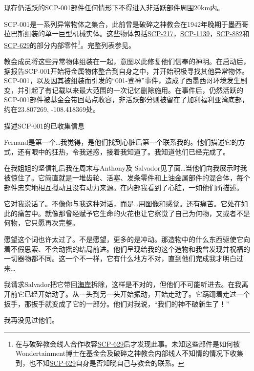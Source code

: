 现存仍活跃的SCP-001部件任何情形下不得进入非活跃部件周围20km内。

SCP-001是一系列异常物体之集合，此前曾是破碎之神教会在1942年晚期于墨西哥拉巴斯组装的单一巨型机械实体。这些物体包括\hyperref[chap:SCP-217]{SCP-217}，\hyperref[chap:SCP-1139]{SCP-1139}，\hyperref[chap:SCP-882]{SCP-882}和\hyperref[chap:SCP-629]{SCP-629}的部分内部零件\footnote{在与破碎教会线人合作收容\hyperref[chap:SCP-629]{SCP-629}后才发现此事。未知这些部件是如何被 Wondertainment博士在基金会及破碎之神教会内部线人不知情的情况下收集到，也不知\hyperref[chap:SCP-629]{SCP-629}自身是否知晓自己与教会的联系。}。完整列表参见。

教会成员将这些异常物体组装在一起，意图以此修复他们信奉的神明。在启动后，据报告SCP-001开始将金属物体整合到自身之中，并开始积极寻找其他异常物体。SCP-001，以及因其被组装而引发的“001-登神”事件，造成了西墨西哥环境发生剧变，并引起了有记载以来最大范围的一次记忆删除施用。在事件后，仍然活跃的SCP-001部件被基金会带回站点收容，非活跃部分则被留在了加利福利亚湾底部，约在23.807269, -108.418369处。

描述SCP-001的已收集信息

\begin{scpbox}


Fernand是第一个…我觉得，是他们找到心脏后第一个联系我的。他们描述它的方式，还有眼中的狂热，令我迷惑，接着我知道了。我知道他们已经完成了。

在我姐姐的坚信礼后我在周末与Anthony及 Salvador见了面…当他们向我展示时我被惊住了。它简直就是一堆齿轮、活塞、发条零件和上油金属部件的混合体，每个部件忠实地相互搅动且没有动力来源。在内部我看到了心脏，一如他们所描述。

它对我说话了。不像你与我这种对话，而是…用图像和感觉。还有痛苦。它处在如此的痛苦中。就像那曾经赋予它生命的火花也让它察觉了自己为何物，又或者不是何物，它只愿再次完整。

愿望这个词也许太过了。不是愿望，更多的是冲动。那造物中的什么东西驱使它向着不假思索、不会动摇的结局前进。他们呈现给我的这个造物和我曾发现并祝福的一切器物都不同。这一个不一样，它有什么地方不对，直到他们完成我才明白过来…

我请求Salvador把它带回\hyperref[chap:SCP-2217]{海岸}拆除，这样是不对的，但他们不可能听进去。在我离开前它已经开始动了。从一头到另一头开始振动，开始走动了。它蹒跚着走过一个扳手，那扳手就变成了它的一部分。他们对我说，“我们的神不破新生了！”

我再没见过他们。

\end{scpbox}

